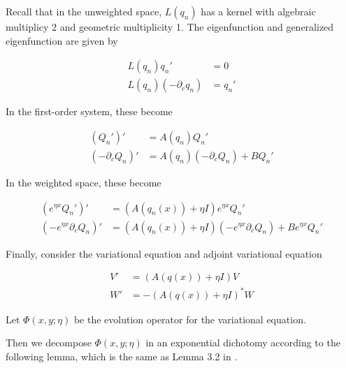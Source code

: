 \documentclass[12pt]{article}
\begin{document}
Recall that in the unweighted space, $L(q_n)$ has a kernel with algebraic multiplicy 2 and geometric multiplicity 1. The eigenfunction and generalized eigenfunction are given by

\begin{align*}
L(q_n) q_n' &= 0 \\
L(q_n) (-\partial_c q_n) &= q_n'
\end{align*}

In the first-order system, these become

\begin{align*}
(Q_n')' &= A(q_n) Q_n' \\
(-\partial_c Q_n)' &= A(q_n) (-\partial_c Q_n) + B Q_n'
\end{align*}

In the weighted space, these become

\begin{align*}
(e^{\eta x} Q_n')' &= (A(q_n(x)) + \eta I) e^{\eta x}  Q_n' \\
(-e^{\eta x} \partial_c Q_n)' &= (A(q_n(x)) + \eta I) (-e^{\eta x} \partial_c Q_n) + B e^{\eta x} Q_n'
\end{align*}

Finally, consider the variational equation and adjoint variational equation

\begin{align}
V' &= (A(q(x)) + \eta I)V \label{vareq} \\
W' &= -(A(q(x)) + \eta I)^* W \label{adjvareq}
\end{align}
  
Let $\Phi(x, y; \eta)$ be the evolution operator for the variational equation. 

Then we decompose $\Phi(x, y; \eta)$ in an exponential dichotomy according to the following lemma, which is the same as Lemma 3.2 in \cite{Sandstede1998}.

\end{document}
